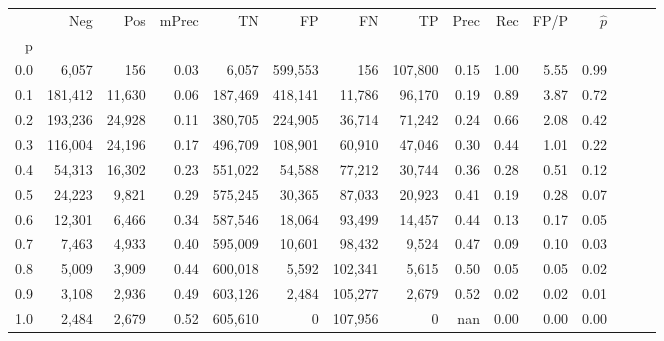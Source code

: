 \begin{tabular}{rrrrrrrrrrrrrrr}
\toprule
{} &      Neg &     Pos & mPrec &       TN &       FP &       FN &       TP &  Prec &   Rec &  FP/P & $\hat{p}$ \\
p   &          &         &       &          &          &          &          &       &       &       &           \\
\midrule
0.0 &    6,057 &     156 &  0.03 &    6,057 &  599,553 &      156 &  107,800 &  0.15 &  1.00 &  5.55 &      0.99 \\
0.1 &  181,412 &  11,630 &  0.06 &  187,469 &  418,141 &   11,786 &   96,170 &  0.19 &  0.89 &  3.87 &      0.72 \\
0.2 &  193,236 &  24,928 &  0.11 &  380,705 &  224,905 &   36,714 &   71,242 &  0.24 &  0.66 &  2.08 &      0.42 \\
0.3 &  116,004 &  24,196 &  0.17 &  496,709 &  108,901 &   60,910 &   47,046 &  0.30 &  0.44 &  1.01 &      0.22 \\
0.4 &   54,313 &  16,302 &  0.23 &  551,022 &   54,588 &   77,212 &   30,744 &  0.36 &  0.28 &  0.51 &      0.12 \\
0.5 &   24,223 &   9,821 &  0.29 &  575,245 &   30,365 &   87,033 &   20,923 &  0.41 &  0.19 &  0.28 &      0.07 \\
0.6 &   12,301 &   6,466 &  0.34 &  587,546 &   18,064 &   93,499 &   14,457 &  0.44 &  0.13 &  0.17 &      0.05 \\
0.7 &    7,463 &   4,933 &  0.40 &  595,009 &   10,601 &   98,432 &    9,524 &  0.47 &  0.09 &  0.10 &      0.03 \\
0.8 &    5,009 &   3,909 &  0.44 &  600,018 &    5,592 &  102,341 &    5,615 &  0.50 &  0.05 &  0.05 &      0.02 \\
0.9 &    3,108 &   2,936 &  0.49 &  603,126 &    2,484 &  105,277 &    2,679 &  0.52 &  0.02 &  0.02 &      0.01 \\
1.0 &    2,484 &   2,679 &  0.52 &  605,610 &        0 &  107,956 &        0 &   nan &  0.00 &  0.00 &      0.00 \\
\bottomrule
\end{tabular}
